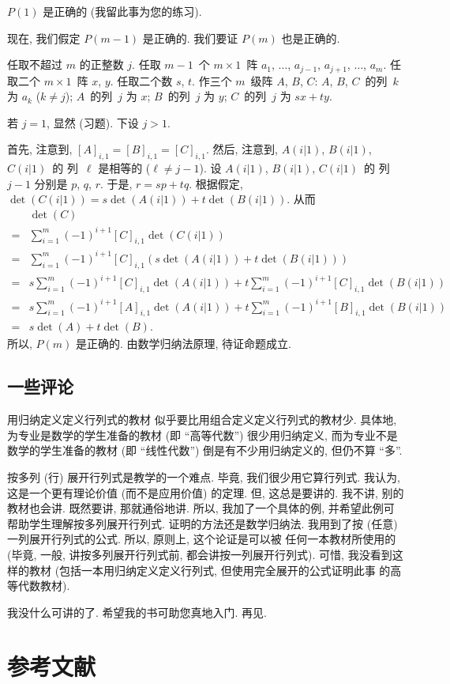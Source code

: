 \documentclass[%
    UTF8,%
    fontset=none,%
    punct=kaiming,%
    zihao=-4,%
    a4paper,%
    oneside,%
]{ctexbook}
\begin{document}
\(P(1)\) 是正确的 (我留此事为您的练习).

现在, 我们假定 \(P(m-1)\) 是正确的.
我们要证 \(P(m)\) 也是正确的.

任取不超过 \(m\) 的正整数 \(j\).
任取 \(m-1\)~个 \(m \times 1\)~阵
\(a_1\), \(\dots\), \(a_{j-1}\),
\(a_{j+1}\), \(\dots\), \(a_m\).
任取二个 \(m \times 1\)~阵 \(x\), \(y\).
任取二个数 \(s\), \(t\).
作三个 \(m\)~级阵 \(A\), \(B\), \(C\):
\(A\), \(B\), \(C\)~的列~\(k\) 为 \(a_k\) (\(k \neq j\));
\(A\)~的列~\(j\) 为 \(x\);
\(B\)~的列~\(j\) 为 \(y\);
\(C\)~的列~\(j\) 为 \(sx + ty\).

若 \(j = 1\), 显然 (习题).
下设 \(j > 1\).

首先, 注意到,
\([A]_{i,1} = [B]_{i,1} = [C]_{i,1}\).
然后, 注意到,
\(A(i|1)\), \(B(i|1)\), \(C(i|1)\)~的%
列~\(\ell\) 是相等的 (\(\ell \neq j-1\)).
设 \(A(i|1)\), \(B(i|1)\), \(C(i|1)\)~的%
列~\(j-1\) 分别是
\(p\), \(q\), \(r\).
于是, \(r = sp + tq\).
根据假定,
\(\det {(C(i|1))} = s\det {(A(i|1))} + t\det {(B(i|1))}\).
从而
\begin{align*}
         & \det {(C)}
    \\
    = {} &
    \sum_{i = 1}^{m}
    {(-1)^{i+1} [C]_{i,1} \det {(C(i|1))}}
    \\
    = {} &
    \sum_{i = 1}^{m}
    {(-1)^{i+1} [C]_{i,1} (s\det {(A(i|1))} + t\det {(B(i|1))})}
    \\
    = {} &
    s \sum_{i = 1}^{m}
    {(-1)^{i+1} [C]_{i,1} \det {(A(i|1))}}
    +
    t \sum_{i = 1}^{m}
    {(-1)^{i+1} [C]_{i,1} \det {(B(i|1))}}
    \\
    = {} &
    s \sum_{i = 1}^{m}
    {(-1)^{i+1} [A]_{i,1} \det {(A(i|1))}}
    +
    t \sum_{i = 1}^{m}
    {(-1)^{i+1} [B]_{i,1} \det {(B(i|1))}}
    \\
    = {} &
    s \det {(A)} + t \det {(B)}.
\end{align*}
所以, \(P(m)\) 是正确的.
由数学归纳法原理, 待证命题成立.

\section{一些评论}

用归纳定义定义行列式的教材%
似乎要比用组合定义定义行列式的教材少.
具体地, 为专业是数学的学生准备的教材
(即 ``高等代数'')
很少用归纳定义,
而为专业不是数学的学生准备的教材
(即 ``线性代数'')
倒是有不少用归纳定义的,
但仍不算 ``多''.

\vspace{2ex}

按多列 (行) 展开行列式是教学的一个难点.
毕竟, 我们很少用它算行列式.
我认为, 这是一个更有理论价值 (而不是应用价值)
的定理.
但, 这总是要讲的.
我不讲, 别的教材也会讲.
既然要讲, 那就通俗地讲.
所以, 我加了一个具体的例,
并希望此例可帮助学生理解按多列展开行列式.
证明的方法还是数学归纳法.
我用到了按 (任意) 一列展开行列式的公式.
所以, 原则上,
这个论证是可以被%
任何一本教材所使用的
(毕竟, 一般, 讲按多列展开行列式前,
都会讲按一列展开行列式).
可惜, 我没看到这样的教材
(包括一本用归纳定义定义行列式,
但使用完全展开的公式证明此事%
的高等代数教材).

\vspace{2ex}

我没什么可讲的了.
希望我的书可助您真地入门.
再见.

\backmatter

\chapter{参考文献}
\nocite{*}
\printbibliography
\end{document}
